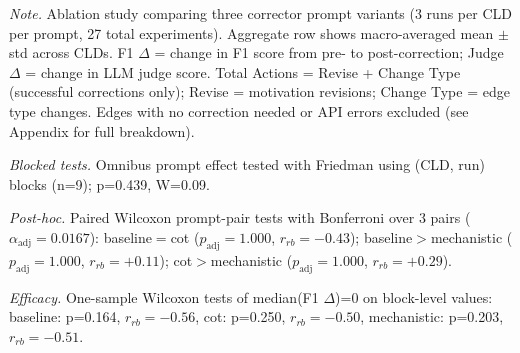 \begin{table}[H]
\centering
\begin{minipage}{\linewidth}
\centering
\caption{Corrector Prompt Ablation on Ground Truth: Performance Comparison}
\label{tab:rq1b_prompt_ablation_groundtruth}
\begin{threeparttable}
\end{threeparttable}
\vspace{0.5em}
\footnotesize
\textit{Note.} Ablation study comparing three corrector prompt variants (3 runs per CLD per prompt, 27 total experiments). 
Aggregate row shows macro-averaged mean $\pm$ std across CLDs.
F1 $\Delta$ = change in F1 score from pre- to post-correction; Judge $\Delta$ = change in LLM judge score.
Total Actions = Revise + Change Type (successful corrections only); Revise = motivation revisions; Change Type = edge type changes.
Edges with no correction needed or API errors excluded (see Appendix for full breakdown).\par
\textit{Blocked tests.} Omnibus prompt effect tested with Friedman using (CLD, run) blocks (n=9); p=0.439, W=0.09.\par
\textit{Post-hoc.} Paired Wilcoxon prompt-pair tests with Bonferroni over 3 pairs ($\alpha_{\text{adj}}=0.0167$): baseline$=$cot ($p_{\text{adj}}=1.000$, $r_{rb}=-0.43$); baseline$>$mechanistic ($p_{\text{adj}}=1.000$, $r_{rb}=+0.11$); cot$>$mechanistic ($p_{\text{adj}}=1.000$, $r_{rb}=+0.29$).\par
\textit{Efficacy.} One-sample Wilcoxon tests of median(F1 $\Delta$)=0 on block-level values: baseline: p=0.164, $r_{rb}=-0.56$, cot: p=0.250, $r_{rb}=-0.50$, mechanistic: p=0.203, $r_{rb}=-0.51$.

\end{minipage}
\end{table}
